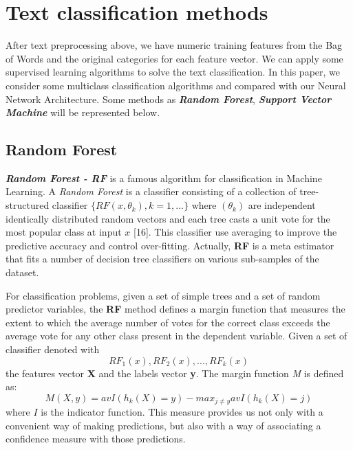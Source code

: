 \documentclass[conference]{IEEEtran}
\begin{document}
%
\section{Text classification methods}
After text preprocessing above, we have numeric training features from the Bag of Words and the original categories for each feature vector. We can apply some supervised learning algorithms to solve the text classification. In this paper, we consider some multiclass classification algorithms and compared with our Neural Network Architecture. Some methods as \textbf{\textit{Random Forest}}, \textit{\textbf{Support Vector Machine}} will be represented below.

\subsection{Random Forest}
\textit{\textbf{Random Forest - RF}} is a famous algorithm for classification in Machine Learning. A \textit{Random Forest} is a classifier consisting of a collection of tree-structured classifier $\{RF(x, \theta_k), k=1,...\}$ where $(\theta_k)$ are independent identically distributed random vectors and each tree casts a unit vote for the most popular class at input $x$ [16]. This classifier use averaging to improve the predictive accuracy and control over-fitting. Actually, \textbf{RF} is a meta estimator that fits a number of decision tree classifiers on various sub-samples of the dataset. 

For classification problems, given a set of simple trees and a set of random predictor variables, the \textbf{RF} method defines a margin function that measures the extent to which the average number of votes for the correct class exceeds the average vote for any other class present in the dependent variable. Given a set of classifier denoted with \[RF_1(x), RF_2(x),..., RF_k(x)\]
the features vector \textbf{X} and the labels vector \textbf{y}. The margin function \textit{M} is defined as: 
\[M(X,y)=avI(h_k(X)=y)-max_{j\neq y}avI(h_k(X)=j)\]
where $I$ is the indicator function. This measure provides us not only with a convenient way of making predictions, but also with a way of associating a confidence measure with those predictions. 
\end{document}
